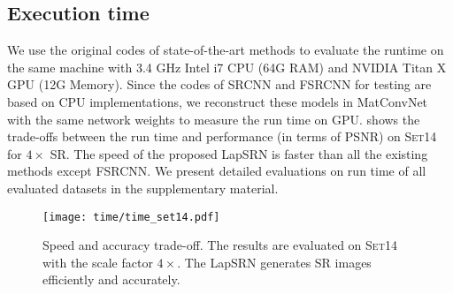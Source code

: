 \documentclass[10pt,twocolumn,letterpaper]{article}
\begin{document}
	\subsection{Execution time}
	\label{sec:time}
	We use the original codes of state-of-the-art methods to evaluate the runtime on the same machine with 3.4 GHz Intel i7 CPU (64G RAM) and NVIDIA Titan X GPU (12G Memory).
	Since the codes of SRCNN and FSRCNN for testing are based on CPU implementations, we reconstruct these models in MatConvNet with the same network weights to measure the run time on GPU.
	 shows the trade-offs between the run time and performance (in terms of PSNR) on \textsc{Set14} for $4\times$ SR.
	The speed of the proposed LapSRN is faster than all the existing methods except FSRCNN.
	We present detailed evaluations on run time of all evaluated datasets in the supplementary material.
	
	\begin{figure}[t]
		\centering
		\texttt{[image: time/time\_set14.pdf]}
		\vspace{-2mm}
		\caption{
			Speed and accuracy trade-off.
			The results are evaluated on \textsc{Set14} with the scale factor $4\times$. 
			The LapSRN generates SR images efficiently and accurately.
		}
		\label{fig:time-chart}
		\vspace{-4mm}
	\end{figure}
	
\end{document}
